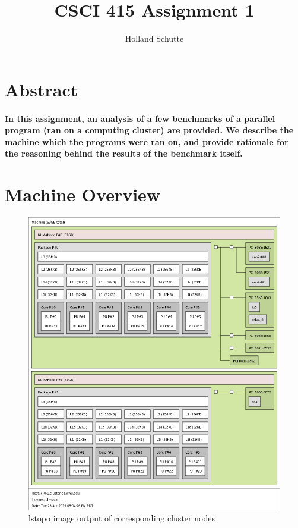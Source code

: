 \documentclass{article}
\begin{document}
\title{CSCI 415 Assignment 1}
\author{Holland Schutte}
\maketitle

\section {Abstract}

\paragraph{
In this assignment, an analysis of a few benchmarks of a parallel program (ran on a computing cluster) are provided.
We describe the machine which the programs were ran on, and provide rationale for the reasoning behind the results
of the benchmark itself.}

\section {Machine Overview}

\begin{figure}[h]
\caption{lstopo image output of corresponding cluster nodes}
\centering
\includegraphics[width=\textwidth]{cluster}
\end{figure}
\end{document}

